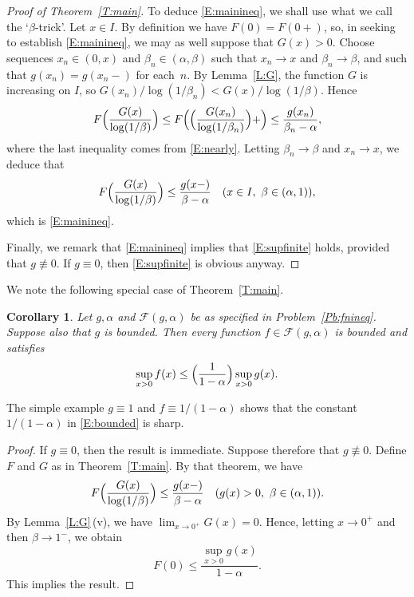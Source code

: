 \documentclass[11pt,reqno]{amsart}
\theoremstyle{plain}
\newtheorem{corollary}[theorem]{Corollary}
\theoremstyle{definition}
\theoremstyle{remark}
\newcommand{\cF}{\mathcal{F}}
\begin{document}
\begin{proof}[Proof of Theorem~\ref{T:main}]
To deduce \eqref{E:mainineq},
we shall use what we call the `$\beta$-trick'. 
Let $x\in I$. 
By definition we have $F(0)=F(0+)$, so, in 
seeking to establish \eqref{E:mainineq}, 
we may as well suppose that $G(x)>0$.
Choose sequences $x_n\in(0,x)$
and $\beta_n\in(\alpha,\beta)$ such that $x_n\to x$
and $\beta_n\to\beta$, and 
such that $g(x_n)=g(x_n-)$ for each~$n$.
By Lemma~\ref{L:G}, the function $G$ is increasing on $I$, so
$G(x_n)/\log(1/\beta_n)<G(x)/\log(1/\beta)$.
Hence
\[
F\Bigl(\frac{G(x)}{\log(1/\beta)}\Bigr)
\le F\Bigl(\Bigl(\frac{G(x_n)}{\log(1/\beta_n)}\Bigr)+\Bigr)
\le \frac{g(x_n)}{\beta_n-\alpha},
\]
where the last inequality comes from \eqref{E:nearly}.
Letting $\beta_n\to\beta$ and $x_n\to x$, we deduce that
\[
F\Bigl(\frac{G(x)}{\log(1/\beta)}\Bigr)
\le\frac{g(x-)}{\beta-\alpha}
\quad(x\in I,~\beta\in(\alpha,1)),
\]
which is \eqref{E:mainineq}.

Finally, we remark that \eqref{E:mainineq}
implies that \eqref{E:supfinite} holds, provided that $g\not\equiv0$.
If $g\equiv0$, then \eqref{E:supfinite} is obvious anyway.
\end{proof}

We note the following special case of Theorem~\ref{T:main}.

\begin{corollary}\label{C:bounded}
Let $g,\alpha$ and $\cF(g,\alpha)$ be as specified in Problem~\ref{Pb:fnineq}.
Suppose also that $g$ is bounded. Then every function $f\in\cF(g,\alpha)$ is bounded
and satisfies
\begin{equation}\label{E:bounded}
\sup_{x>0}f(x)\le \Bigl(\frac{1}{1-\alpha}\Bigr)\sup_{x>0}g(x).
\end{equation}
\end{corollary}

The simple example $g\equiv 1$ and $f\equiv 1/(1-\alpha)$
shows that the constant $1/(1-\alpha)$ in \eqref{E:bounded} is sharp.

\begin{proof}
If $g\equiv0$, then the result is immediate. 
Suppose therefore that $g\not\equiv0$.
Define $F$ and $G$ as in Theorem~\ref{T:main}.
By that theorem, we have
\[
F\Bigl(\frac{G(x)}{\log(1/\beta)}\Bigr)
\le\frac{g(x-)}{\beta-\alpha}
\quad(g(x)>0,~\beta\in(\alpha,1)).
\]
By Lemma~\ref{L:G}\,(v), we have $\lim_{x\to0^+}G(x)=0$.
Hence, letting $x\to0^+$ and then $\beta\to1^-$, we obtain
\[
F(0)\le \frac{\sup_{x>0}{g(x)}}{1-\alpha}.
\]
This implies the result.
\end{proof}
\end{document}
